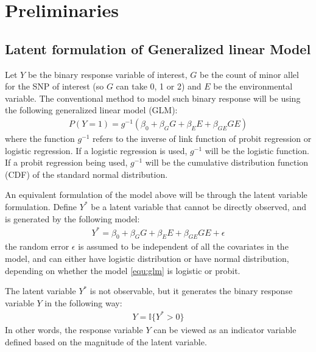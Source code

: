 

\section{Preliminaries}\label{sec:prelim}

\subsection{Latent formulation of Generalized linear Model}\label{subsec:latent}

Let $Y$ be the binary response variable of interest, $G$ be the count of minor allel for the SNP of interest (so $G$ can take 0, 1 or 2) and $E$ be the environmental variable. The conventional method to model such binary response will be using the following generalized linear model (GLM):
\begin{equation}\label{equ:glm}
\begin{aligned}
P(Y = 1) = g^{-1}(\beta_0+\beta_GG + \beta_EE + \beta_{GE}GE)
\end{aligned}
\end{equation}
where the function $g^{-1}$ refers to the inverse of link function of probit regression or logistic regression. If a logistic regression is used, $g^{-1}$ will be the logistic function. If a probit regression being used, $g^{-1}$ will be the cumulative distribution function (CDF) of the standard normal distribution.


An equivalent formulation of the model above will be through the latent variable formulation. Define $Y^*$ be a latent variable that cannot be directly observed, and is generated by the following model:
\begin{equation}\label{equ:latentgenerating1}
\begin{aligned}
Y^* = \beta_0+\beta_GG + \beta_EE + \beta_{GE}GE + \epsilon
\end{aligned}
\end{equation}
the random error $\epsilon$ is assumed to be independent of all the covariates in the model, and can either have logistic distribution or have normal distribution, depending on whether the model \ref{equ:glm} is logistic or probit. 


The latent variable $Y^*$ is not observable, but it generates the binary response variable $Y$ in the following way:
\begin{equation}\label{equ:latentgenerating2}
\begin{aligned}
Y = \mathbb{I}\{Y^* > 0\}
\end{aligned}
\end{equation}
In other words, the response variable $Y$ can be viewed as an indicator variable defined based on the magnitude of the latent variable. 

